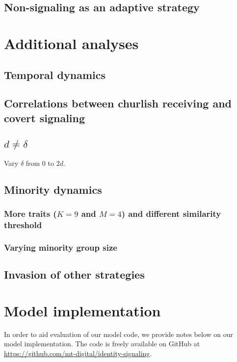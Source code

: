\documentclass[11pt,letterpaper]{article}
\begin{document}
\subsection{Non-signaling as an adaptive strategy}

% 


% 

\appendix

\section{Additional analyses}

\subsection{Temporal dynamics}

\subsection{Correlations between churlish receiving and covert signaling}

\subsection{$d \neq \delta$}

Vary $\delta$ from 0 to $2d$.

\subsection{Minority dynamics} 

\subsubsection{More traits ($K=9$ and $M=4$) and different similarity threshold}

\subsubsection{Varying minority group size}

\subsection{Invasion of other strategies}


\section{Model implementation}

In order to aid evaluation of our model code, we provide notes below on 
our model implementation. The code is freely available on GitHub at
\url{https://github.com/mt-digital/identity-signaling}.
\end{document}
